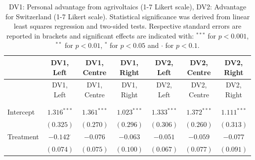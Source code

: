 
\begin{center}
\begin{small}
\begin{longtable}{l@{} c@{} c@{} c@{} c@{} c@{} c@{}}
\hline
 & \shortstack{\rule{0pt}{2.2ex}DV1,\\Left} & \shortstack{\rule{0pt}{2.2ex}DV1,\\Centre} & \shortstack{\rule{0pt}{2.2ex}DV1,\\Right} & \shortstack{\rule{0pt}{2.2ex}DV2,\\Left} & \shortstack{\rule{0pt}{2.2ex}DV2,\\Centre} & \shortstack{\rule{0pt}{2.2ex}DV2,\\Right} \\
\hline
\endfirsthead
\hline
 & \shortstack{\rule{0pt}{2.2ex}DV1,\\Left} & \shortstack{\rule{0pt}{2.2ex}DV1,\\Centre} & \shortstack{\rule{0pt}{2.2ex}DV1,\\Right} & \shortstack{\rule{0pt}{2.2ex}DV2,\\Left} & \shortstack{\rule{0pt}{2.2ex}DV2,\\Centre} & \shortstack{\rule{0pt}{2.2ex}DV2,\\Right} \\
\hline
\endhead
\hline
\endfoot
\hline
\multicolumn{7}{l}{\tiny{
}}\\
\caption{DV1: Personal advantage from agrivoltaics (1-7 Likert scale), DV2: Advantage for Switzerland (1-7 Likert scale). Statistical significance was derived from linear least squares regression and two-sided tests. 
                Respective standard errors are reported in brackets and significant effects are indicated with: $^{***}$ for $p < 0.001$, $^{**}$ for $p < 0.01$, $^*$ for $p < 0.05$ and $\cdot$ for $p < 0.1$.}
\label{table:coefficients}
\endlastfoot \\
Intercept                           & $1.316^{***}$    & $1.361^{***}$ & $1.023^{***}$    & $1.333^{***}$   & $1.372^{***}$ & $1.111^{***}$    \\
                                    & $(0.325)$        & $(0.270)$     & $(0.296)$        & $(0.306)$       & $(0.260)$     & $(0.313)$        \\
Treatment                           & $-0.142^{\cdot}$ & $-0.076$      & $-0.063$         & $-0.051$        & $-0.059$      & $-0.077$         \\
                                    & $(0.074)$        & $(0.075)$     & $(0.100)$        & $(0.067)$       & $(0.077)$     & $(0.091)$        \\

\end{longtable}
\end{small}
\end{center}
